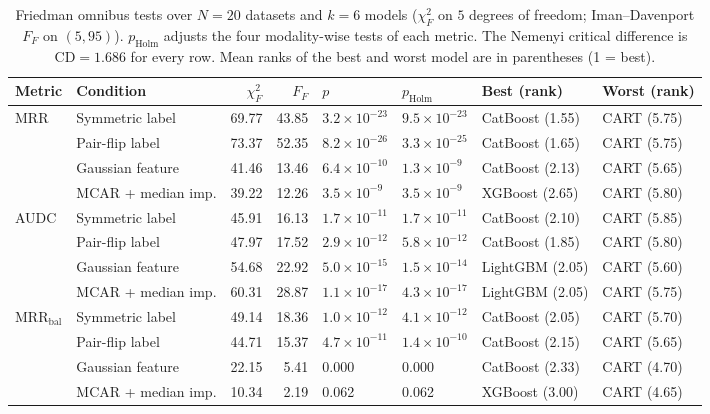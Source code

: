 \begin{table}[t]
\centering
\footnotesize
\setlength{\tabcolsep}{3.5pt}
\caption{Friedman omnibus tests over $N=20$ datasets and $k=6$ models ($\chi^2_F$ on $5$ degrees of freedom; Iman--Davenport $F_F$ on $(5,95)$). $p_{\mathrm{Holm}}$ adjusts the four modality-wise tests of each metric. The Nemenyi critical difference is $\mathrm{CD}=1.686$ for every row. Mean ranks of the best and worst model are in parentheses (1 = best).}
\label{tab:friedman}
\begin{tabular}{@{}llrrllll@{}}
\toprule
Metric & Condition & $\chi^2_F$ & $F_F$ & $p$ & $p_{\mathrm{Holm}}$ & Best (rank) & Worst (rank) \\
\midrule
MRR & Symmetric label & 69.77 & 43.85 & $3.2\times10^{-23}$ & $9.5\times10^{-23}$ & CatBoost (1.55) & CART (5.75) \\
 & Pair-flip label & 73.37 & 52.35 & $8.2\times10^{-26}$ & $3.3\times10^{-25}$ & CatBoost (1.65) & CART (5.75) \\
 & Gaussian feature & 41.46 & 13.46 & $6.4\times10^{-10}$ & $1.3\times10^{-9}$ & CatBoost (2.13) & CART (5.65) \\
 & MCAR + median imp. & 39.22 & 12.26 & $3.5\times10^{-9}$ & $3.5\times10^{-9}$ & XGBoost (2.65) & CART (5.80) \\
\midrule
AUDC & Symmetric label & 45.91 & 16.13 & $1.7\times10^{-11}$ & $1.7\times10^{-11}$ & CatBoost (2.10) & CART (5.85) \\
 & Pair-flip label & 47.97 & 17.52 & $2.9\times10^{-12}$ & $5.8\times10^{-12}$ & CatBoost (1.85) & CART (5.80) \\
 & Gaussian feature & 54.68 & 22.92 & $5.0\times10^{-15}$ & $1.5\times10^{-14}$ & LightGBM (2.05) & CART (5.60) \\
 & MCAR + median imp. & 60.31 & 28.87 & $1.1\times10^{-17}$ & $4.3\times10^{-17}$ & LightGBM (2.05) & CART (5.75) \\
\midrule
MRR$_{\mathrm{bal}}$ & Symmetric label & 49.14 & 18.36 & $1.0\times10^{-12}$ & $4.1\times10^{-12}$ & CatBoost (2.05) & CART (5.70) \\
 & Pair-flip label & 44.71 & 15.37 & $4.7\times10^{-11}$ & $1.4\times10^{-10}$ & CatBoost (2.15) & CART (5.65) \\
 & Gaussian feature & 22.15 & 5.41 & 0.000 & 0.000 & CatBoost (2.33) & CART (4.70) \\
 & MCAR + median imp. & 10.34 & 2.19 & 0.062 & 0.062 & XGBoost (3.00) & CART (4.65) \\
\bottomrule
\end{tabular}
\end{table}
